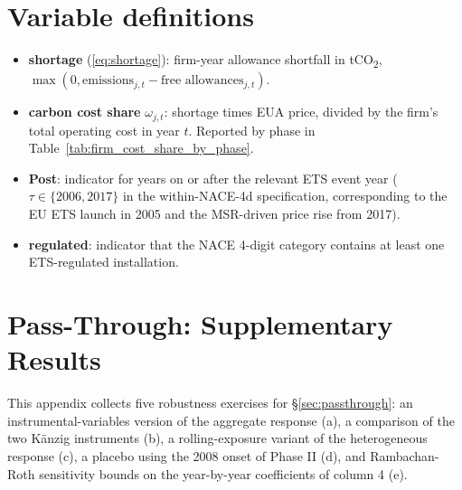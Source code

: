 \section{Variable definitions}\label{app:variables}

\begin{itemize}
    \item \textbf{shortage} (\eqref{eq:shortage}): firm-year allowance shortfall in tCO\textsubscript{2}, $\max(0, \text{emissions}_{j,t} - \text{free allowances}_{j,t})$.
    \item \textbf{carbon cost share} $\omega_{j,t}$: shortage times EUA price, divided by the firm's total operating cost in year $t$. Reported by phase in Table~\ref{tab:firm_cost_share_by_phase}.
    \item \textbf{Post}: indicator for years on or after the relevant ETS event year ($\tau \in \{2006, 2017\}$ in the within-NACE-4d specification, corresponding to the EU ETS launch in 2005 and the MSR-driven price rise from 2017).
    \item \textbf{regulated}: indicator that the NACE 4-digit category contains at least one ETS-regulated installation.
\end{itemize}

%
%

\section{Pass-Through: Supplementary Results}\label{app:passthrough}

This appendix collects five robustness exercises for §\ref{sec:passthrough}: an instrumental-variables version of the aggregate response (a), a comparison of the two Känzig instruments (b), a rolling-exposure variant of the heterogeneous response (c), a placebo using the 2008 onset of Phase II (d), and Rambachan-Roth sensitivity bounds on the year-by-year coefficients of column 4 (e).

